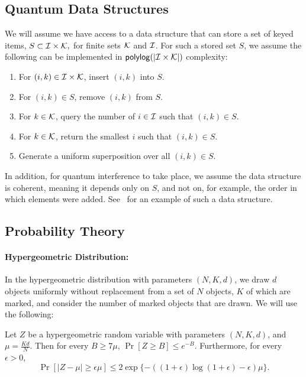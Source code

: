 \documentclass{article}
\renewcommand{\>}{\rangle}
\newcommand{\<}{\langle}
\renewcommand{\(}{\left(}
\renewcommand{\)}{\right)}
\begin{document}
\subsection{Quantum Data Structures}\label{sec:data}

We will assume we have access to a data structure that can store a set of keyed items,
$S\subset {\cal I}\times {\cal K},$
for finite sets ${\cal K}$ and ${\cal I}$. For such a stored set $S$, we assume the following can be implemented in ${\sf polylog}(|{\cal I}\times {\cal K}|)$ complexity:
\begin{enumerate}
\item For $(i,k)\in {\cal I}\times {\cal K}$, insert $(i,k)$ into $S$.
\item For $(i,k)\in S$, remove $(i,k)$ from $S$.
\item For $k\in {\cal K}$, query the number of $i\in {\cal I}$ such that $(i,k)\in S$.
\item For $k\in{\cal K}$, return the smallest $i$ such that $(i,k)\in S$.
\item Generate a uniform superposition over all $(i,k)\in S$.  
\end{enumerate}

In addition, for quantum interference to take place, we assume the data structure is coherent, meaning it depends only on $S$, and not on, for example, the order in which elements were added. See~\cite[Section 3.1]{buhrman2022limits} for an example of such a data structure.


\subsection{Probability Theory}\label{sec:prelim-prob}

\paragraph{Hypergeometric Distribution:} In the hypergeometric distribution with parameters $(N,K,d)$, we draw $d$ objects uniformly without replacement from a set of $N$ objects, $K$ of which are marked, and consider the number of marked objects that are drawn.  We will use the following:
\begin{lemma}\label{lem:hypergeo}
Let $Z$ be a hypergeometric random variable with parameters $(N,K,d)$, and $\mu=\frac{Kd}{N}$. Then for every $B\geq 7\mu$, $\Pr[Z\geq B]\leq e^{-B}$. Furthermore, for every $\epsilon>0$, 
$$\Pr[|Z-\mu|\geq \epsilon\mu]\leq 2\exp\{-((1+\epsilon)\log(1+\epsilon)-\epsilon)\mu\}.$$
\end{lemma}
\end{document}
